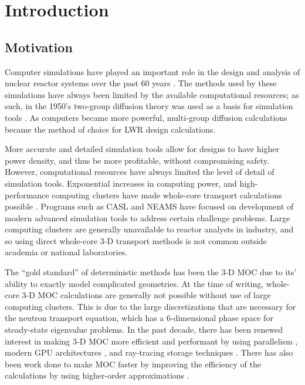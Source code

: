 \chapter{Introduction}{\label{ch:Introduction}
    \section{Motivation}{\label{sec:Introduction:Motivation}
        Computer simulations have played an important role in the design and analysis of nuclear reactor systems over the past 60 years \cite{FewGroupDiffusion}.
        The methods used by these simulations have always been limited by the available computational resources; as such, in the 1950's two-group diffusion theory was used as a basis for simulation tools \cite{FewGroupDiffusion}.
        As computers became more powerful, multi-group diffusion calculations became the method of choice for \ac{LWR} design calculations.

        More accurate and detailed simulation tools allow for designs to have higher power density, and thus be more profitable, without compromising safety.
        However, computational resources have always limited the level of detail of simulation tools.
        Exponential increases in computing power, and high-performance computing clusters have made whole-core transport calculations possible \cite{CASMO-4,Apollo2-2010,DeCART,Denovo,Yang2010,Boyd2014,Collins2016,Gunow2018}.
        Programs such as \ac{CASL} and \ac{NEAMS} have focused on development of modern advanced simulation tools to address certain challenge problems.
        Large computing clusters are generally unavailable to reactor analysts in industry, and so using direct whole-core 3-D transport methods is not common outside academia or national laboratories.

        The ``gold standard'' of deterministic methods has been the 3-D \ac{MOC} \cite{Askew1972} due to its' ability to exactly model complicated geometries.
        At the time of writing, whole-core 3-D \ac{MOC} calculations are generally not possible without use of large computing clusters.
        This is due to the large discretizations that are necessary for the neutron transport equation, which has a 6-dimensional phase space for steady-state eigenvalue problems.
        In the past decade, there has been renewed interest in making 3-D \ac{MOC} more efficient and performant by using parallelism \cite{Kochunas2013}, modern \ac{GPU} architectures \cite{Boyd2014}, and ray-tracing storage techniques \cite{Sciannandrone2016, Gunow2016}.
        There has also been work done to make \ac{MOC} faster by improving the efficiency of the calculations by using higher-order approximations \cite{Ferrer2016,Gunow2018}.

}}
